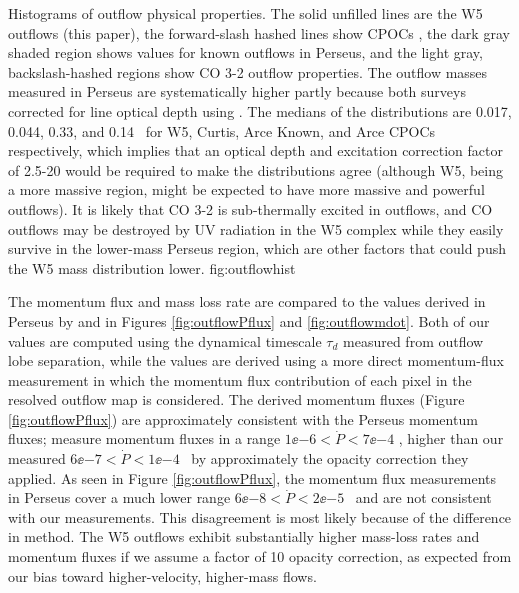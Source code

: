 {Histograms of outflow physical properties.  
The solid unfilled lines are the W5 outflows (this paper), the forward-slash
hashed lines show \citet{arce2010} CPOCs , the dark gray
shaded region shows \citet{arce2010} values for known outflows in Perseus, and
the light gray, backslash-hashed regions show \citet{curtis2010} CO 3-2 outflow
properties.  The outflow masses measured in Perseus are systematically higher
partly because both surveys corrected for line optical depth using \thirteenco.
The medians of the distributions are 0.017, 0.044, 0.33, and 0.14 \msun\ for
W5, Curtis, Arce Known, and Arce CPOCs respectively, which implies that an
optical depth and excitation correction factor of 2.5-20 would be required to
make the distributions agree (although W5, being a more massive region, might
be expected to have more massive and powerful outflows).  It is likely that CO
3-2 is sub-thermally excited in outflows, and CO outflows may be destroyed by
UV radiation in the W5 complex while they easily survive in the lower-mass
Perseus region, which are other factors that could push the W5 mass
distribution lower.
}
{fig:outflowhist}

The momentum flux and mass loss rate are compared to the values derived in
Perseus by \citet{hatchell2007} and \citet{curtis2010} in Figures
\ref{fig:outflowPflux} and \ref{fig:outflowmdot}.  Both of our values are
computed using the dynamical timescale $\tau_d$ measured from outflow lobe
separation, while the \citet{hatchell2007} values are derived using a more
direct momentum-flux measurement in which the momentum flux contribution 
of each pixel in the resolved outflow map is considered.  
The derived
momentum fluxes (Figure \ref{fig:outflowPflux}) are approximately consistent
with the \citet{curtis2010} Perseus momentum fluxes; \citet{curtis2010} measure
momentum fluxes in a range $1\ee{-6}<\dot{P}<7\ee{-4}$ \msun \kms \peryr,
higher than our measured $6\ee{-7}<\dot{P}<1\ee{-4}$ \msun \kms \peryr\ by
approximately the opacity correction they applied.  As seen in Figure
\ref{fig:outflowPflux}, the \citet{hatchell2007} momentum flux measurements in
Perseus cover a much lower range $6\ee{-8}<\dot{P}<2\ee{-5}$ \msun \kms \peryr\
and are not consistent with our measurements.  This disagreement is most likely
because of the difference in method.  The W5 outflows exhibit
substantially higher mass-loss rates and momentum fluxes if we assume a factor
of 10 opacity correction, as expected from our bias toward higher-velocity,
higher-mass flows.

